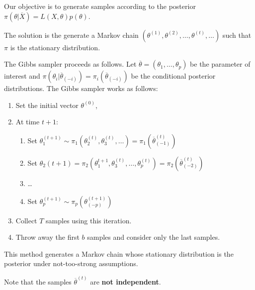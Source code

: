 \begin{defn}
  \label{sec:bayes-infer-assoc-1}
  Our objective is to generate samples according to the posterior
  $\pi(\theta | \overline X) = L(X, \theta) p(\theta)$.

  The solution is the generate a Markov chain $(\theta^{(1)},
  \theta^{(2)}, \dots, \theta^{(t)}, \dots)$ such that $\pi$ is the
  stationary distribution.
\end{defn}

\begin{defn}
  \label{sec:bayes-infer-assoc-2}
  The Gibbs sampler proceeds as follows. Let $\overline \theta =
  (\theta_{1}, \dots, \theta_{p})$ be the parameter of interest and
  $\pi(\theta_{i} | \overline \theta_{(-i)}) = \pi_{i}(\overline
  \theta_{(-i)})$ be the conditional posterior distributions. The
  Gibbs sampler works as follows:
  \begin{enumerate}
  \item Set the initial vector $\theta^{(0)}$,
  \item At time $t+1$:
    \begin{enumerate}
    \item Set $\theta_{1}^{(t+1)} \sim \pi_{1}(\theta_{2}^{(t)},
      \theta_{3}^{(t)}, \dots) = \pi_{1}(\overline \theta^{(t)}_{(-1)})$
    \item Set $\theta_{2}(t+1) = \pi_{2}(\theta_{1}^{t+1},
      \theta_{3}^{(t)}, \dots, \theta_{p}^{(t)}) =  \pi_{2}(\overline
      \theta^{(t)}_{(-2)})$
    \item \dots
    \item Set $\theta_{p}^{(t+1)} \sim \pi_{p}(\theta^{(t+1)}_{(-p)})$
    \end{enumerate}
  \item Collect $T$ samples using this iteration.
  \item Throw away the first $b$ samples and consider only the last samples.
  \end{enumerate}

  This method generates a Markov chain whose stationary distribution
  is the posterior under not-too-strong assumptions.

  Note that the samples $\overline \theta^{(t)}$ are \textbf{not independent}.
\end{defn}



